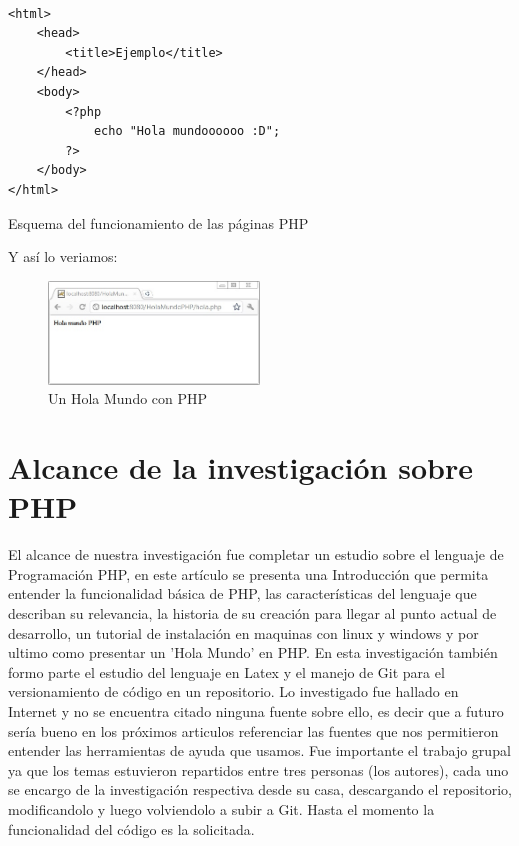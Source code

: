 \documentclass[11pt]{article} %
\begin{document}
\begin{lstlisting}[frame=single]  % Start your code-block

<html>
    <head>
        <title>Ejemplo</title>
    </head>
    <body>
        <?php
            echo "Hola mundoooooo :D";
        ?>
    </body>
</html>
\end{lstlisting}
\begin{center}
Esquema del funcionamiento de las páginas PHP \cite{[2]}
\end{center}
Y así lo veriamos:
\begin{figure}[H]
  \centering
    \includegraphics[width=0.5\textwidth]{Imagenes/HolaMundoPHP-Navegador}
  \caption{Un Hola Mundo con PHP}
  \label{fig:funcionamiento}
\end{figure}

\section{Alcance de la investigación sobre PHP}
El alcance de nuestra investigación fue completar un estudio sobre el lenguaje de Programación PHP, en este artículo se presenta una Introducción que permita entender la funcionalidad básica de PHP, las características del lenguaje que describan su relevancia, la historia de su creación para llegar al punto actual de desarrollo, un tutorial de instalación en maquinas con linux y windows y por ultimo como presentar un 'Hola Mundo' en PHP.
En esta investigación también formo parte el estudio del lenguaje en Latex y el manejo de Git para el versionamiento de código en un repositorio. Lo investigado fue hallado en Internet y no se encuentra citado ninguna fuente sobre ello, es decir que a futuro sería bueno en los próximos articulos referenciar las fuentes que nos permitieron entender las herramientas de ayuda que usamos.
Fue importante el trabajo grupal ya que los temas estuvieron repartidos entre tres personas (los autores), cada uno se encargo de la investigación respectiva desde su casa, descargando el repositorio, modificandolo y luego volviendolo a subir a Git. 
Hasta el momento la funcionalidad del código es la solicitada. 
\end{document}
